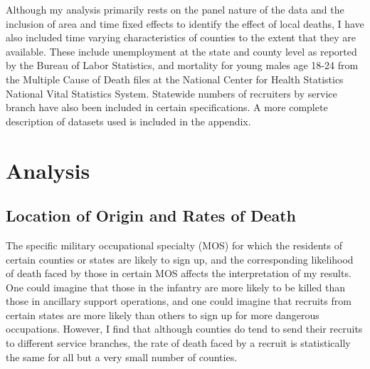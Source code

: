 \documentclass[12pt] {article}
\begin{document}
Although my analysis primarily rests on the panel nature of the data
and the inclusion of area and time fixed effects to identify the effect
of local deaths, I have also included time varying characteristics
of counties to the extent that they are available. These include unemployment
at the state and county level as reported by the Bureau of Labor Statistics, and mortality for young males age 18-24 from the Multiple Cause of Death files at the National Center for Health Statistics National Vital Statistics System. Statewide numbers of recruiters by service branch have also been included in certain specifications. 
A more complete description of datasets used is included in the appendix.

\section{Analysis\label{sec:Analysis}}

\subsection{Location of Origin and Rates of Death\label{sec:deathrate}}
The specific military occupational specialty (MOS) for which the residents of certain counties or states are likely to sign up, and the corresponding likelihood of death faced by those in certain MOS affects the interpretation of my results. One could imagine that those in the infantry are more likely to be killed than those in ancillary support operations, and one could imagine that recruits from certain states are more likely than others to sign up for more dangerous occupations. However, I find that although counties do tend to send their recruits to different service branches, the rate of death faced by a recruit is statistically the same for all but a very small number of counties.  %
\end{document}
